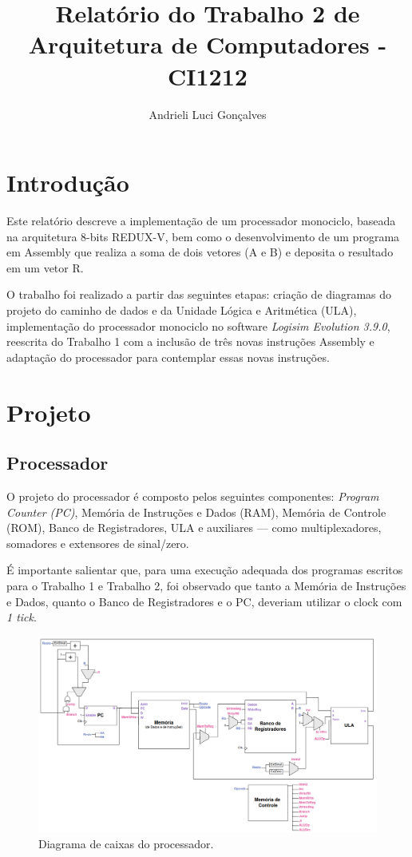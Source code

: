 \documentclass[twocolumn, 11pt]{article}
\author{Andrieli Luci Gonçalves}
\title{Relatório do Trabalho 2 de Arquitetura de Computadores - CI1212}
\begin{document}
\maketitle        

\section{Introdução}

Este relatório descreve a implementação de um processador monociclo, baseada na arquitetura 8-bits REDUX-V, bem como o desenvolvimento de um programa em Assembly que realiza a soma de dois vetores (A e B) e deposita o resultado em um vetor R.

O trabalho foi realizado a partir das seguintes etapas: criação de diagramas do projeto do caminho de dados e da Unidade Lógica e Aritmética (ULA), implementação do processador monociclo no software \textit{Logisim Evolution 3.9.0}, reescrita do Trabalho 1 com a inclusão de três novas instruções Assembly e adaptação do processador para contemplar essas novas instruções. 

\section{Projeto}

\subsection{Processador}

O projeto do processador é composto pelos seguintes componentes: \textit{Program Counter (PC)}, Memória de Instruções e Dados (RAM), Memória de Controle (ROM), Banco de Registradores, ULA e auxiliares — como multiplexadores, somadores e extensores de sinal/zero.

É importante salientar que, para uma execução adequada dos programas escritos para o Trabalho 1 e Trabalho 2, foi observado que tanto a Memória de Instruções e Dados, quanto o Banco de Registradores e o PC, deveriam utilizar o clock com \textit{1 tick}.

\begin{figure}[h]
    \centering
    \includegraphics[width=0.9\linewidth]{datapath_processador.png}
    \caption{Diagrama de caixas do processador.}
    \label{fig:enter-label}
\end{figure}
\end{document}
